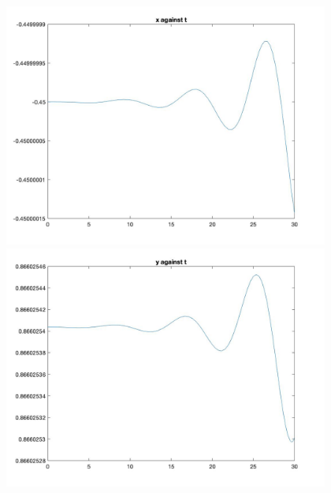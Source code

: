 \documentclass[11pt]{article}
\begin{document}
\begin{figure}[H]
\includegraphics[width = 12cm, height = 8cm]{Q5(7).jpg}
\includegraphics[width = 12cm, height = 8cm]{Q5(8).jpg}
\end{figure}
\end{document}
